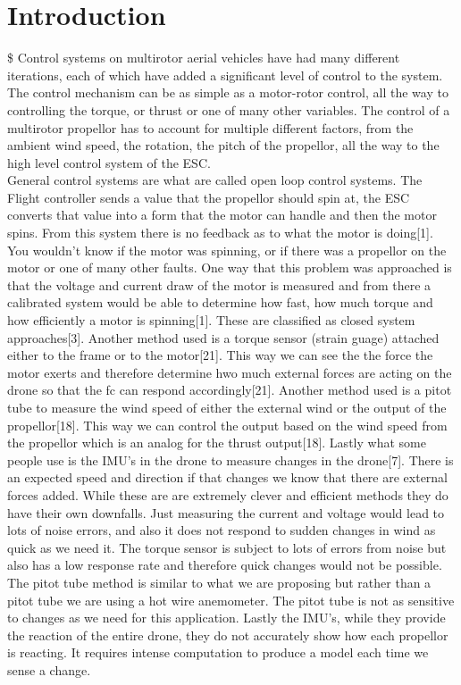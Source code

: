 \documentclass{article}
\begin{document}
\section{Introduction}


\$ Control systems on multirotor aerial vehicles have had many different iterations, each of which have added a significant level of control to the system. The control mechanism can be as simple as a motor-rotor control, all the way to controlling the torque, or thrust or one of many other variables. The control of a multirotor propellor has to account for multiple different factors, from the ambient wind speed, the rotation, the pitch of the propellor, all the way to the high level control system of the ESC. \\

General control systems are what are called open loop control systems. The Flight controller sends a value that the propellor should spin at, the ESC converts that value into a form that the motor can handle and then the motor spins. From this system there is no feedback as to what the motor is doing[1]. You wouldn't know if the motor was spinning, or if there was a propellor on the motor or one of many other faults. One way that this problem was approached is that the voltage and current draw of the motor is measured and from there a calibrated system would be able to determine how fast, how much torque and how efficiently a motor is spinning[1]. These are classified as closed system approaches[3]. Another method used is a torque sensor (strain guage) attached either to the frame or to the motor[21]. This way we can see the the force the motor exerts and therefore determine hwo much external forces are acting on the drone so that the fc can respond accordingly[21]. Another method used is a pitot tube to measure the wind speed of either the external wind or the output of the propellor[18]. This way we can control the output based on the wind speed from the propellor which is an analog for the thrust output[18]. Lastly what some people use is the IMU's in the drone to measure changes in the drone[7]. There is an expected speed and direction if that changes we know that there are external forces added. While these are are extremely clever and efficient methods they do have their own downfalls. Just measuring the current and voltage would lead to lots of noise errors, and also it does not respond to sudden changes in wind as quick as we need it. The torque sensor is subject to lots of errors from noise but also has a low response rate and therefore quick changes would not be possible. The pitot tube method is similar to what we are proposing but rather than a pitot tube we are using a hot wire anemometer. The pitot tube is not as sensitive to changes as we need for this application. Lastly the IMU's, while they provide the reaction of the entire drone, they do not accurately show how each propellor is reacting. It requires intense computation to produce a model each time we sense a change. 
\end{document}
